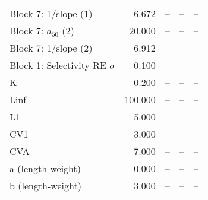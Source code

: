 \documentclass[
]{article}
\begin{document}
\begin{landscape}
\begin{longtable}[t]{lrrrr}
Block 7: 1/slope (1) & 6.672 & -- & -- & --\\
Block 7: $a_{50}$ (2) & 20.000 & -- & -- & --\\
Block 7: 1/slope (2) & 6.912 & -- & -- & --\\
\addlinespace
Block 1: Selectivity RE $\sigma$ & 0.100 & -- & -- & --\\
K & 0.200 & -- & -- & --\\
Linf & 100.000 & -- & -- & --\\
L1 & 5.000 & -- & -- & --\\
CV1 & 3.000 & -- & -- & --\\
\addlinespace
CVA & 7.000 & -- & -- & --\\
a (length-weight) & 0.000 & -- & -- & --\\
b (length-weight) & 3.000 & -- & -- & --\\*
\end{longtable}
\end{landscape}
\end{document}
